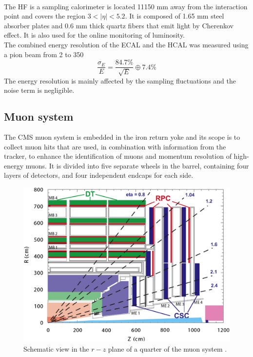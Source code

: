 \\
The HF is a sampling calorimeter is located 11150 mm away from the interaction point and covers the region $3<|\eta|<5.2$. It is composed of 1.65 mm steel absorber plates and 0.6 mm thick quartz fibers that emit light by Cherenkov effect. It is also used for the online monitoring of luminosity.
\\
The combined energy resolution of the ECAL and the HCAL was measured using a pion beam from 2 \GeV to 350 \GeV \cite{Abdullin2008TheGeV/c}
\begin{equation}
    \frac{\sigma_E}{E}= \frac{84.7\%}{\sqrt{E}} \oplus 7.4 \%
\end{equation}
The energy resolution is mainly affected by the sampling fluctuations and the noise term is negligible.

\subsection{Muon system}
The CMS muon system \cite{Layter1997TheReport} is embedded in the iron return yoke and its scope is to collect muon hits that are used, in combination with information from the tracker, to enhance the identification of muons and momentum resolution of high-energy muons.
It is divided into five separate wheels in the barrel, containing four layers of detectors, and four independent endcaps for each side.

\begin{figure}[h!]
    \centering
    \includegraphics[width=0.85\linewidth]{fig//chap03-cms/muon_system.jpg}
    \caption{Schematic view in the $r-z$ plane of a quarter of the muon system \cite{Piccolo2011CMSPerformance}.}
    \label{fig:muon_system}
\end{figure}


